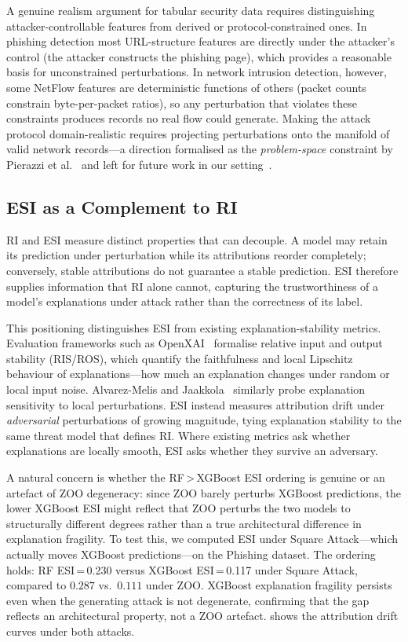 \documentclass[runningheads]{llncs}
\begin{document}
A genuine realism argument for tabular security data requires distinguishing
attacker-controllable features from derived or protocol-constrained ones.  In
phishing detection most URL-structure features are directly under the attacker's
control (the attacker constructs the phishing page), which provides a reasonable
basis for unconstrained perturbations.  In network intrusion detection, however,
some NetFlow features are deterministic functions of others (packet counts
constrain byte-per-packet ratios), so any perturbation that violates these
constraints produces records no real flow could generate.  Making the attack protocol domain-realistic requires projecting perturbations
onto the manifold of valid network records---a direction formalised as the
\emph{problem-space} constraint by Pierazzi et al.~\cite{pierazzi2020intriguing}
and left for future work in our setting~\cite{apruzzese2022modeling}.

\subsection{ESI as a Complement to RI}

RI and ESI measure distinct properties that can decouple.  A model
may retain its prediction under perturbation while its attributions reorder
completely; conversely, stable attributions do not guarantee a stable prediction.
ESI therefore supplies information that RI alone cannot, capturing the
trustworthiness of a model's explanations under attack rather than the
correctness of its label.

This positioning distinguishes ESI from existing explanation-stability metrics.
Evaluation frameworks such as OpenXAI~\cite{agarwal2022openxai} formalise
relative input and output stability (RIS/ROS), which quantify the faithfulness
and local Lipschitz behaviour of explanations---how much an explanation changes
under random or local input noise.  Alvarez-Melis and
Jaakkola~\cite{alvarezmelis2018robust} similarly probe explanation sensitivity
to local perturbations.  ESI instead measures attribution drift under
\emph{adversarial} perturbations of growing magnitude, tying explanation
stability to the same threat model that defines RI.  Where existing metrics ask
whether explanations are locally smooth, ESI asks whether they survive an
adversary.

A natural concern is whether the RF\,>\,XGBoost ESI ordering is genuine or an
artefact of ZOO degeneracy: since ZOO barely perturbs XGBoost predictions, the
lower XGBoost ESI might reflect that ZOO perturbs the two models to structurally
different degrees rather than a true architectural difference in explanation
fragility.  To test this, we computed ESI under Square Attack---which actually
moves XGBoost predictions---on the Phishing dataset.  The ordering holds: RF
ESI\,=\,0.230 versus XGBoost ESI\,=\,0.117 under Square Attack, compared to
$0.287$ vs.\ $0.111$ under ZOO.  XGBoost explanation fragility persists even
when the generating attack is not degenerate, confirming that the gap reflects an
architectural property, not a ZOO artefact.
 shows the attribution drift curves under both attacks.
\end{document}
